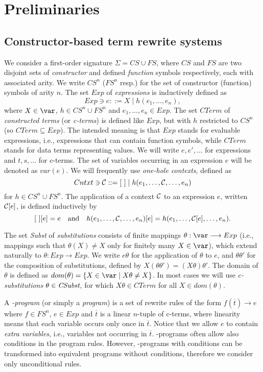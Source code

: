 \documentclass{llncs}
\begin{document}
\section{Preliminaries}\label{preliminaries}
\subsection{Constructor-based term rewrite systems}
\label{trs}


We consider a first-order signature
$\Sigma = CS\cup FS$, where $CS$ and $FS$ are two disjoint sets of \emph{constructor}
and defined \emph{function} symbols respectively, each with associated arity. We
write $CS^n$ ($FS^n$ resp.) for the set of constructor (function) symbols of
arity $n$.
The set $Exp$ of \emph{expressions} is inductively defined as
\[
  Exp \ni e::= X \mid h(e_1,\ldots,e_n),
\]
where $X\in\var$, $h\in CS^n\cup FS^n$ and $e_1,\ldots,e_n\in Exp$.
The set $CTerm$ of \emph{constructed terms} (or \emph{c-terms}) is
defined like $Exp$, but with $h$ restricted to $CS^n$ (so
$CTerm \subseteq Exp$). The intended meaning is that $Exp$ stands for
evaluable expressions, i.e., expressions that can contain function
symbols, while $CTerm$ stands for data terms representing values. We
will write $e,e',\ldots$ for expressions and $t,s,\ldots$ for c-terms.
The set of variables occurring in an expression $e$ will be denoted as
$var(e)$.
We will frequently use \emph{one-hole  contexts}, defined as
\[
  Cntxt \ni {\cal C} ::= [\ ] \mid h(e_1,\ldots,{\cal C},\ldots,e_n)
\]
for $h\in CS^n\cup FS^n$. The application of a context ${\cal C}$ to
an expression $e$, written ${\cal C}[e]$, is defined inductively by
\[
  [\ ][e] = e \quad\text{and}\quad
  h(e_1,\ldots,{\cal C},\ldots,e_n)[e] = h(e_1,\ldots,{\cal C}[e],\ldots,e_n).
\]

The set \emph{Subst} of \emph{substitutions} consists of finite
mappings $\theta:\var \longrightarrow Exp$ (i.e., mappings such that
$\theta(X) \neq X$ only for finitely many $X\in\var$), which extend
naturally to $\theta:Exp \longrightarrow
Exp$. We write $e\theta$ for the application of $\theta$ to $e$, and
$\theta\theta'$ for the composition of substitutions, defined by
$X(\theta\theta') = (X\theta)\theta'$. The domain of $\theta$ is defined as $dom(\theta) = \{X\in \var \mid X\theta \neq
X\}$. In most cases we will use \emph{c-substitutions}
$\theta \in \emph{CSubst}$, for which $X\theta \in CTerm$ for all $X\in dom(\theta)$.




A \emph{\crwl{}-program} (or simply a \emph{program})
is a set of rewrite rules of the form $f(\overline{t})\to e$ where
$f\in FS^n$, $e\in Exp$ and $\overline{t}$ is a linear $n$-tuple of
c-terms, where linearity means that each variable occurs only once in
$\overline{t}$. Notice that we allow $e$ to contain \emph{extra
  variables}, i.e., variables not occurring in $\overline{t}$.
\crwl{}-programs often
allow also conditions in the program rules. However, \crwl{}-programs
with conditions can be transformed into equivalent programs without conditions,
therefore we consider only unconditional rules.
\end{document}
